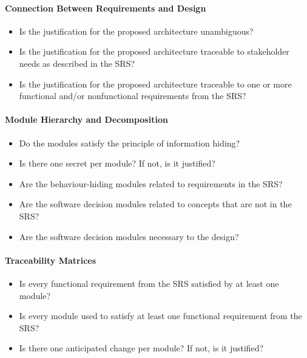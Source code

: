\paragraph{Connection Between Requirements and Design}
\begin{itemize}

    \item Is the justification for the proposed architecture unambiguous?

    \item Is the justification for the proposed architecture traceable to
    stakeholder needs as described in the SRS?

    \item Is the justification for the proposed architecture traceable to one
    or more functional and/or nonfunctional requirements from the SRS?

\end{itemize}

\paragraph{Module Hierarchy and Decomposition}
\begin{itemize}

    \item Do the modules satisfy the principle of information hiding?

    \item Is there one secret per module? If not, is it justified?

    \item Are the behaviour-hiding modules related to requirements in the SRS?

    \item Are the software decision modules related to concepts that are not in
    the SRS?

    \item Are the software decision modules necessary to the design?

\end{itemize}

\paragraph{Traceability Matrices}
\begin{itemize}

    \item Is every functional requirement from the SRS satisfied by at least
    one module?

    \item Is every module used to satisfy at least one functional requirement
    from the SRS?

    \item Is there one anticipated change per module? If not, is it justified?

\end{itemize}

